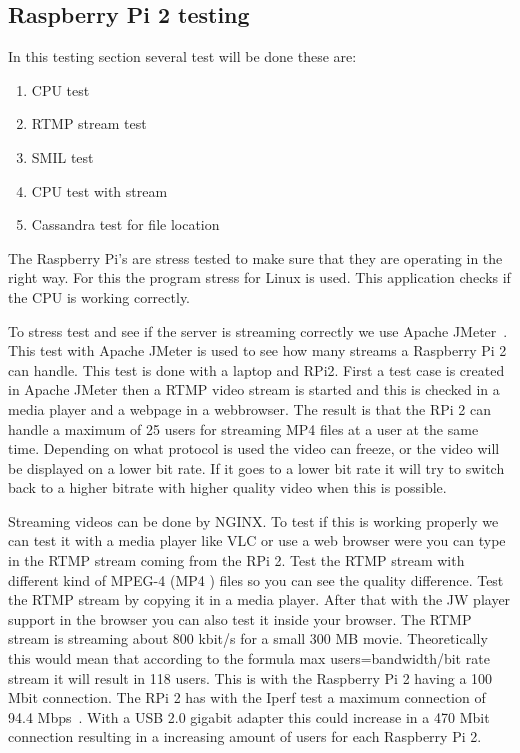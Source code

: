 \documentclass{sig-alternate-br}
\begin{document}
\subsection{Raspberry Pi 2  testing}

In this testing section several test will be done these are: 
\begin{enumerate}[topsep=0pt,itemsep=-1ex,partopsep=1ex,parsep=1ex] 
	\item CPU test
	\item RTMP stream test
	\item SMIL test
	\item CPU test with stream
	\item Cassandra test for file location
\end{enumerate}


The Raspberry Pi's are stress tested to make sure that they are operating in the right way. For this the program stress for Linux is used. 
This application checks if the CPU is working correctly.

To stress test and see if the server is streaming correctly we use Apache JMeter~\cite{jmeter}. This test with Apache JMeter is used to see how many streams a Raspberry Pi 2 can handle. This test is done with a laptop and RPi2. First a test case is created in Apache JMeter then a RTMP video stream is started and this is checked in a media player and a webpage in a webbrowser. The result is that the RPi 2 can handle a maximum of 25 users for streaming MP4 files at a user at the same time. Depending on what protocol is used the video can freeze, or the video will be displayed on a lower bit rate. If it goes to a lower bit rate it will try to switch back to a higher bitrate with higher quality video when this is possible. 

Streaming videos can be done by NGINX. To test if this is working properly we can test it with a media player like VLC or use a web browser were you can type in the RTMP stream coming from the RPi 2. Test the RTMP stream with different kind of MPEG-4 (MP4 ) files so you can see the quality difference. Test the RTMP stream by copying it in a media player. After that with the JW player support in the browser you can also test it inside your browser. The RTMP stream is streaming about 800 kbit/s for a small 300 MB movie. Theoretically this would mean that according to the formula max users=bandwidth/bit rate stream it will result in 118 users. This is with the Raspberry Pi 2 having a 100 Mbit connection.  The RPi 2 has with the Iperf test a maximum connection of  94.4 Mbps~\cite{ipref}. With a USB 2.0 gigabit adapter this could increase in a 470 Mbit connection resulting in a increasing amount of users for each Raspberry Pi 2. 
\end{document}
